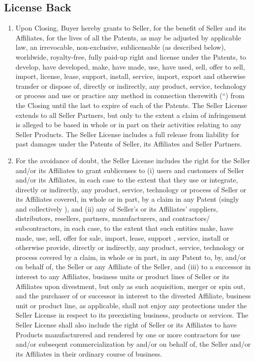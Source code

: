 \documentclass[letterpaper,10pt,openany,oneside,english]{sphinxmanual}
\begin{document}
\subsection{License Back}
\label{\detokenize{3-transfer:license-back}}\begin{enumerate}
\item {} 
Upon Closing, Buyer hereby grants to Seller, for the benefit of Seller and its Affiliates, for the lives of all the Patents, as may be adjusted by applicable law, an irrevocable, non-exclusive, sublicensable (as described below), worldwide, royalty-free, fully paid-up right and license under the Patents, to develop, have developed, make, have made, use, have used, sell, offer to sell, import, license, lease, support, install, service, import, export and otherwise transfer or dispose of, directly or indirectly, any product, service, technology or process and use or practice any method in connection therewith (“) from the Closing until the last to expire of each of the Patents. The Seller License extends to all Seller Partners, but only to the extent a claim of infringement is alleged to be based in whole or in part on their activities relating to any Seller Products. The Seller License includes a full release from liability for past damages under the Patents of Seller, its Affiliates and Seller Partners.

\item {} 
For the avoidance of doubt, the Seller License includes the right for the Seller and/or its Affiliates to grant sublicenses to (i) users and customers of Seller and/or its Affiliates, in each case to the extent that they use or integrate, directly  or indirectly, any product, service, technology or process of Seller or its Affiliates covered, in whole or in part, by a claim in any Patent (singly  and collectively ), and (ii) any of Seller’s or its Affiliates’ suppliers, distributors, resellers, partners, manufacturers, and contractors/ subcontractors, in each case, to the extent that such entities make, have made, use, sell, offer for sale, import, lease, support , service, install or otherwise provide, directly or indirectly, any product, service, technology or process covered by a claim, in whole or in part, in any Patent to, by, and/or on behalf of, the Seller or any Affiliate of the Seller, and (iii) to a successor in interest to any Affiliates, business units or product lines of Seller or its Affiliates upon divestment, but only as such acquisition, merger or spin out, and the purchaser of or successor in interest to the divested Affiliate, business unit or product line, as applicable, shall not enjoy any protections under the Seller License in respect to its preexisting business, products or services. The Seller License shall also include the right of Seller or its Affiliates to have Products manufacturered and rendered by one or more contractors for use and/or subseqent commercialization by and/or on behalf of, the Seller and/or its Affiliates in their ordinary course of business.


\end{enumerate}
\end{document}
